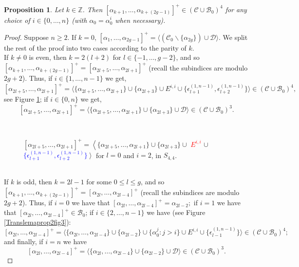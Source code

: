 \documentclass[twoside,11pt,a4paper]{article}
\newtheorem{Prop}[Def]{Proposition}
\newcommand*{\Cf}{\mathscr{C}}
\newcommand*{\Bf}{\mathscr{B}}
\newcommand*{\Df}{\mathscr{D}}
\newcommand*{\epsp}[3]{\epsilon_{#1}^{(#2,#3)}}
\begin{document}
\begin{Prop}\label{translemaprop2}
 Let $k \in \mathbb{Z}$. Then $[\alpha_{k+1}, \ldots, \alpha_{k+(2g-1)}]^{+} \in (\Cf \cup \Bf_{0})^{4}$ for any choice of $i \in \{0, \ldots, n\}$ (with $\alpha_{0} = \alpha_{0}^{i}$ when necessary).
\end{Prop}
\begin{proof} Suppose $n \geq 2$. If $k = 0$, $[\alpha_{1}, \ldots, \alpha_{2g-1}]^{+} = \langle (\Cf_{0} \backslash \{\alpha_{2g}\}) \cup \Df\rangle$. We split the rest of the proof into two cases according to the parity of $k$.\\
\indent If $k \neq 0$ is even, then $k = 2(l+2)$ for $l \in \{-1, \ldots, g-2\}$, and so $[\alpha_{k+1}, \ldots, \alpha_{k+(2g-1)}]^{+} = [\alpha_{2l+5}, \ldots, \alpha_{2l+1}]^{+}$ (recall the subindices are modulo $2g+2$). Thus, if $i \in \{1, \ldots, n-1\}$ we get, $$[\alpha_{2l+5}, \ldots, \alpha_{2l+1}]^{+} = \langle \{\alpha_{2l+5}, \ldots, \alpha_{2l+1}\} \cup \{\alpha_{2l+3}\} \cup E^{i,i} \cup \{\epsp{l+1}{1}{n-1}, \epsp{l+2}{1}{n-1}\}\rangle \in (\Cf \cup \Bf_{0})^{4},$$ see Figure \ref{Translemaprop2fig1}; if $i \in \{0,n\}$ we get, $$[\alpha_{2l+5}, \ldots, \alpha_{2l+1}]^{+} = \langle \{\alpha_{2l+5}, \ldots, \alpha_{2l+1}\} \cup \{\alpha_{2l+3}\} \cup \Df\rangle \in (\Cf \cup \Bf_{0})^{3}.$$
\begin{figure}[h]
 \begin{center}
  \resizebox{10cm}{!}{} \\[0.3cm]
  \resizebox{10cm}{!}{} \caption{$[\alpha_{2l+5}, \ldots, \alpha_{2l+1}]^{+} = \left\langle \{\alpha_{2l+5}, \ldots, \alpha_{2l+1}\} \cup \{\alpha_{2l+3}\} \cup \right.$ \textcolor{red}{$E^{i,i}$} $\cup$ \textcolor{blue}{$\{\epsp{l+1}{1}{n-1}, \epsp{l+2}{1}{n-1}\}$}$\left. \right\rangle$ for $l = 0$ and $i = 2$, in $S_{4,4}$.} \label{Translemaprop2fig1}
 \end{center}
\end{figure}\\
\indent If $k$ is odd, then $k = 2l- 1$ for some $0 \leq l \leq g$, and so $[\alpha_{k+1}, \ldots, \alpha_{k+(2g-1)}]^{+} = [\alpha_{2l}, \ldots, \alpha_{2l-4}]^{+}$ (recall the subindices are modulo $2g+2$). Thus, if $i = 0$ we have that $[\alpha_{2l}, \ldots, \alpha_{2l-4}]^{+} = \alpha_{2l-2};$ if $i = 1$ we have that $[\alpha_{2l}, \ldots, \alpha_{2l-4}]^{+} \in \Bf_{0}$; if $i \in \{2, \ldots, n-1\}$ we have (see Figure \ref{Translemaprop2fig3}): $$[\alpha_{2l}, \ldots, \alpha_{2l-4}]^{+} = \langle \{\alpha_{2l}, \ldots, \alpha_{2l-4}\} \cup \{\alpha_{2l-2}\} \cup \{\alpha_{0}^{j}: j > i\} \cup E^{i,i} \cup \{\epsp{l-1}{1}{n-1}\}\rangle \in (\Cf \cup \Bf_{0})^{4};$$ and finally, if $i = n$ we have $$[\alpha_{2l}, \ldots, \alpha_{2l-4}]^{+} =\langle \{\alpha_{2l}, \ldots, \alpha_{2l-4}\} \cup \{\alpha_{2l-2}\} \cup \Df\rangle \in (\Cf \cup \Bf_{0})^{3}.$$

\end{proof}
\end{document}
